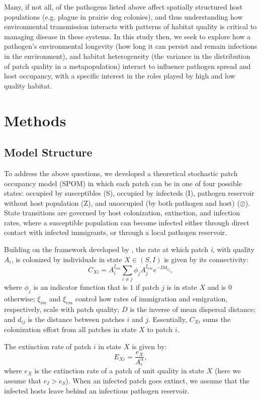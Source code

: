 \documentclass{svjour3}
\begin{document}
Many, if not all, of the pathogens listed above affect spatially structured host populations (e.g. plague in prairie dog colonies), and thus understanding how environmental transmission interacts with patterns of habitat quality is critical to managing disease in these systems.  In this study then, we seek to explore how a pathogen's environmental longevity (how long it can persist and remain infections in the environment), and habitat heterogeneity (the variance in the distribution of patch quality in a metapopulation) interact to influence pathogen spread and host occupancy, with a specific interest in the roles played by high and low quality habitat.  

\section{Methods}
\label{methods}

\subsection{Model Structure}
To address the above questions, we developed a theoretical stochastic patch occupancy model (SPOM) in which each patch can be in one of four possible states: occupied by susceptibles (S), occupied by infecteds (I), pathogen reservoir without host population (Z), and unoccupied (by both pathogen and host) ($\oslash$).  State transitions are governed by host colonization, extinction, and infection rates, where a susceptible population can become infected either through direct contact with infected immigrants, or through a local pathogen reservoir.  

Building on the framework developed by \cite{Hanski1994}, the rate at which patch \emph{i}, with quality $A_i$, is colonized by individuals in state $X \in (S,I)$ is given by its connectivity:
\begin{equation}
C_{Xi}=A_i^{\xi_{im}} \sum_{i\neq j }\phi_jA_j^{\xi_{em}}e^{-D d_{ij}},
\end{equation}
where $\phi_j$ is an indicator function that is $1$ if patch $j$ is in state $X$ and is $0$ otherwise; $\xi_{im}$ and $\xi_{em}$ control how rates of immigration and emigration, respectively, scale with patch quality; $D$ is the inverse of mean dispersal distance; and $d_{ij}$ is the distance between patches $i$ and $j$.  Essentially, $C_{Xi}$ sums the colonization effort from all patches in state $X$ to patch $i$.  

The extinction rate of patch $i$ in state $X$ is given by:
\begin{equation}
E_{Xi}=\frac{e_X}{A_i^\alpha},
\end{equation}
where $e_X$ is the extinction rate of a patch of unit quality in state $X$ (here we assume that $e_I>e_S$).  When an infected patch goes extinct, we assume that the infected hosts leave behind an infectious pathogen reservoir.  
\end{document}
